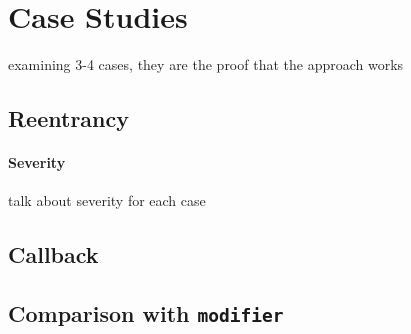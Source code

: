 \section{Case Studies}
\label{sec:case}
examining 3-4 cases, they are the proof that the approach works

\subsection{Reentrancy}

\paragraph{Severity} talk about severity for each case

\subsection{Callback}

\subsection{Comparison with \texttt{modifier}}


